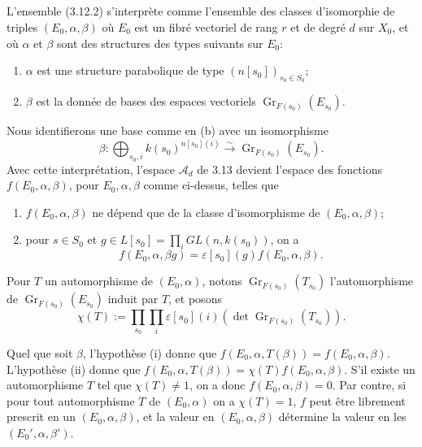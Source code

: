 \documentclass[11pt,a4paper]{article}
\theoremstyle{plain}
\theoremstyle{definition}
\DeclareMathOperator{\Gri}{Gr}
\begin{document}
\subsection{}
L'ensemble (3.12.2) s'interpr\`ete comme l'ensemble des classes d'isomorphie de triples $(E_0, \alpha, \beta)$ o\`u $E_0$ est un fibr\'e vectoriel de rang $r$ et de degr\'e $d$ sur $X_0$, et o\`u $\alpha$ et $\beta$ sont des structures des types suivants sur $E_0$:
\begin{enumerate}[label=(\alph*)]
\item $\alpha$ est une structure parabolique de type $(n[s_0])_{s_0 \in S_0}$;
\item $\beta$ est la donn\'ee de bases des espaces vectoriels $\Gri_{F(s_0)}(E_{s_0})$.
\end{enumerate}
Nous identifierons une base comme en (b) avec un isomorphisme
\[
\beta: \bigoplus_{s_0, i} k(s_0)^{n[s_0](i)} \xrightarrow{\sim} \Gri_{F(s_0)}(E_{s_0}).
\]
Avec cette interpr\'etation, l'espace $\mathcal{A}_d$ de 3.13 devient l'espace des fonctions $f(E_0, \alpha, \beta)$, pour $E_0, \alpha, \beta$ comme ci-dessus, telles que
\begin{enumerate}[label=(\roman*)]
\item $f(E_0, \alpha, \beta)$ ne d\'epend que de la classe d'isomorphisme de $(E_0, \alpha, \beta)$;
\item pour $s \in S_0$ et $g \in L[s_0] = \prod_i GL(n, k(s_0))$, on a
\[
f(E_0, \alpha, \beta g) = \varepsilon[s_0](g) f(E_0, \alpha, \beta).
\]
\end{enumerate}

Pour $T$ un automorphisme de $(E_0, \alpha)$, notons $\Gri_{F(s_0)}(T_{s_0})$ l'automorphisme de $\Gri_{F(s_0)}(E_{s_0})$ induit par $T$, et posons
\begin{equation}
\chi(T) := \prod_{s_0} \prod_i \varepsilon[s_0](i)(\det \Gri_{F(s_0)}(T_{s_0})).
\tag{3.14.1}
\end{equation}

Quel que soit $\beta$, l'hypoth\`ese (i) donne que $f(E_0, \alpha, T(\beta)) = f(E_0, \alpha, \beta)$. L'hypoth\`ese (ii) donne que $f(E_0, \alpha, T(\beta)) = \chi(T) f(E_0, \alpha, \beta)$. S'il existe un automorphisme $T$ tel que $\chi(T) \neq 1$, on a donc $f(E_0, \alpha, \beta) = 0$. Par contre, si pour tout automorphisme $T$ de $(E_0, \alpha)$ on a $\chi(T) = 1$, $f$ peut \^etre librement prescrit en un $(E_0, \alpha, \beta)$, et la valeur en $(E_0, \alpha, \beta)$ d\'etermine la valeur en les $(E_0', \alpha, \beta')$.
\end{document}
